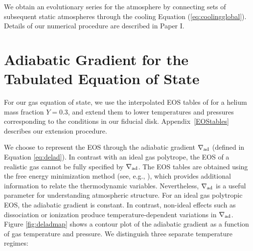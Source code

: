 \documentclass[apj]{emulateapj}
\newcommand{\delad}{\nabla_{\rm ad}}
\newcommand{\App}[1]{Appendix~\ref{#1}}
\newcommand{\co}{_{\rm c}}
\begin{document}

We obtain an evolutionary series for the atmosphere by connecting sets of subsequent static atmospheres through the cooling Equation (\ref{eq:coolingglobal}). Details of our numerical procedure are described in Paper I.



\section{Adiabatic Gradient for the Tabulated Equation of State}
\label{deladtable}





For our gas equation of state, we use the interpolated EOS tables of \citet{saumon95} for a helium mass fraction $Y=0.3$, and extend them to lower temperatures and pressures corresponding to the conditions in our fiducial disk. \App{EOStables} describes our extension procedure.





 We choose to represent the EOS through the adiabatic gradient $\delad$ (defined in Equation \ref{eq:delad}). In contrast with an ideal gas polytrope, the EOS of a realistic gas cannot be fully specified by $\delad$. The \citet{saumon95} EOS tables are obtained using the free energy minimization method (see, e.g., \citealt{graboske69}), which provides additional information to relate the thermodynamic variables. Nevertheless, $\delad$ is a useful parameter for understanding atmospheric structure. For an ideal gas polytropic EOS, the adiabatic gradient is constant. In contrast, non-ideal effects such as dissociation or ionization produce temperature-dependent variations in $\delad$. Figure \ref{fig:deladmap} shows a contour plot of the adiabatic gradient  as a function of gas temperature and pressure. We distinguish three separate temperature regimes:
\end{document}
